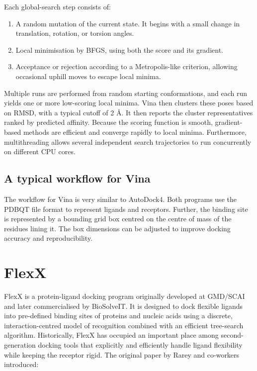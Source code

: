 \documentclass[12pt]{article}
\begin{document}
Each global-search step consists of:
\begin{enumerate}
  \item A random mutation of the current state. It begins with a small change in translation, rotation, or torsion angles.
  \item Local minimisation by BFGS, using both the score and its gradient.
  \item Acceptance or rejection according to a Metropolis-like criterion, allowing occasional uphill moves to escape local minima.
\end{enumerate}

Multiple runs are performed from random starting conformations, and each run yields one or more low-scoring local minima. 
Vina then clusters these poses based on RMSD, with a typical cutoff of 2 \r{A}.  It then reports the cluster representatives ranked by predicted affinity. Because the scoring function is smooth, gradient-based methods are efficient and converge rapidly to local minima.  Furthermore, multithreading allows several independent search trajectories to run concurrently on different CPU cores\cite{CH7_trott2010vina}.

\subsection{A typical workflow for Vina}

The workflow for Vina is very similar to AutoDock4. Both programs use the PDBQT file format to represent ligands and receptors. Further, the binding site is represented by a bounding grid box centred on the centre of mass of the residues lining it. The box dimensions can be adjusted to improve docking accuracy and reproducibility. 


\section{FlexX}
FlexX is a protein-ligand docking program originally developed at GMD/SCAI and later commercialised by BioSolveIT\cite{CH7_rarey1996,CH7_kramer1999}. It is designed to dock flexible ligands into pre-defined binding sites of proteins and nucleic acids using a discrete, interaction-centred model of recognition combined with an efficient tree-search algorithm. Historically, FlexX has occupied an important place among second-generation docking tools that explicitly and efficiently handle ligand flexibility while keeping the receptor rigid.
The original paper by Rarey and co-workers\cite{CH7_rarey1996} introduced:
\end{document}
